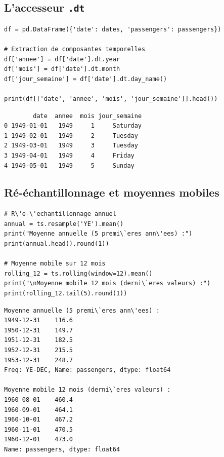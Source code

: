 \subsection{L'accesseur \texttt{.dt}}

\begin{codeblock}[title=\textbf{Python}]
\begin{verbatim}
df = pd.DataFrame({'date': dates, 'passengers': passengers})

# Extraction de composantes temporelles
df['annee'] = df['date'].dt.year
df['mois'] = df['date'].dt.month
df['jour_semaine'] = df['date'].dt.day_name()

print(df[['date', 'annee', 'mois', 'jour_semaine']].head())
\end{verbatim}
\end{codeblock}

\begin{codeoutput}
\begin{verbatim}
        date  annee  mois jour_semaine
0 1949-01-01   1949     1     Saturday
1 1949-02-01   1949     2     Tuesday
2 1949-03-01   1949     3     Tuesday
3 1949-04-01   1949     4     Friday
4 1949-05-01   1949     5     Sunday
\end{verbatim}
\end{codeoutput}

\subsection{R\'e-\'echantillonnage et moyennes mobiles}


\begin{codeblock}[title=\textbf{Python}]
\begin{verbatim}
# R\'e-\'echantillonnage annuel
annual = ts.resample('YE').mean()
print("Moyenne annuelle (5 premi\`eres ann\'ees) :")
print(annual.head().round(1))

# Moyenne mobile sur 12 mois
rolling_12 = ts.rolling(window=12).mean()
print("\nMoyenne mobile 12 mois (derni\`eres valeurs) :")
print(rolling_12.tail(5).round(1))
\end{verbatim}
\end{codeblock}

\begin{codeoutput}
\begin{verbatim}
Moyenne annuelle (5 premi\`eres ann\'ees) :
1949-12-31    116.6
1950-12-31    149.7
1951-12-31    182.5
1952-12-31    215.5
1953-12-31    248.7
Freq: YE-DEC, Name: passengers, dtype: float64

Moyenne mobile 12 mois (derni\`eres valeurs) :
1960-08-01    460.4
1960-09-01    464.1
1960-10-01    467.2
1960-11-01    470.5
1960-12-01    473.0
Name: passengers, dtype: float64
\end{verbatim}
\end{codeoutput}

